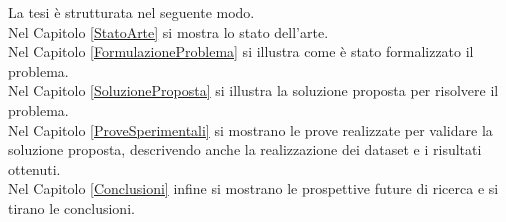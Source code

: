 La tesi \`e strutturata nel seguente modo.\\
Nel Capitolo \ref{StatoArte} si mostra lo stato dell'arte.\\
Nel Capitolo \ref{FormulazioneProblema} si illustra come \`e stato formalizzato il problema.\\
Nel Capitolo \ref{SoluzioneProposta} si illustra la soluzione proposta per risolvere il problema.\\
Nel Capitolo \ref{ProveSperimentali} si mostrano le prove realizzate per validare la soluzione proposta, descrivendo anche la realizzazione dei dataset e i risultati ottenuti.\\
Nel Capitolo \ref{Conclusioni} infine si mostrano le prospettive future di ricerca e si tirano le conclusioni.
	
